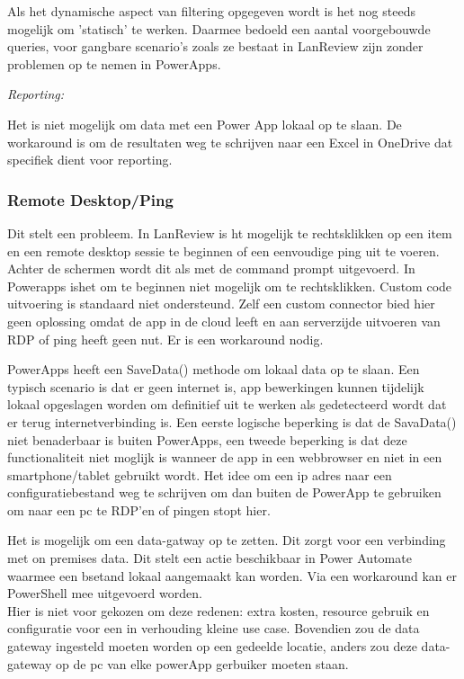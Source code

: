 Als het dynamische aspect van filtering opgegeven wordt is het nog steeds mogelijk om 'statisch' te werken. Daarmee bedoeld een aantal voorgebouwde queries, voor gangbare scenario's zoals ze bestaat in LanReview zijn zonder problemen op te nemen in PowerApps.

\textit{Reporting:}

Het is niet mogelijk om data met een Power App lokaal op te slaan. De workaround is om de resultaten weg te schrijven naar een Excel in OneDrive dat specifiek dient voor reporting.

\subsubsection{Remote Desktop/Ping}
\label{subsec:rdp-ping}

Dit stelt een probleem. In LanReview is ht mogelijk te rechtsklikken op een item en een remote desktop sessie te beginnen of een eenvoudige ping uit te voeren. Achter de schermen wordt dit als met de command prompt uitgevoerd. In Powerapps ishet om te beginnen niet mogelijk om te rechtsklikken. Custom code uitvoering is standaard niet ondersteund. Zelf een custom connector bied hier geen oplossing omdat de app in de cloud leeft en aan serverzijde uitvoeren van RDP of ping heeft geen nut. Er is een workaround nodig.

PowerApps heeft een SaveData() methode om lokaal data op te slaan. Een typisch scenario is dat er geen internet is, app bewerkingen kunnen tijdelijk lokaal opgeslagen worden om definitief uit te werken als gedetecteerd wordt dat er terug internetverbinding is. Een eerste logische beperking is dat de SavaData() niet benaderbaar is buiten PowerApps, een tweede beperking is dat deze functionaliteit niet moglijk is wanneer de app in een webbrowser en niet in een smartphone/tablet gebruikt wordt. Het idee om een ip adres naar een configuratiebestand weg te schrijven om dan buiten de PowerApp te gebruiken om naar een pc te RDP'en of pingen stopt hier.

Het is mogelijk om een data-gatway op te zetten. Dit zorgt voor een verbinding met on premises data. Dit stelt een actie beschikbaar in Power Automate waarmee een bsetand lokaal aangemaakt kan worden. Via een workaround kan er PowerShell mee uitgevoerd worden. \autocite{Luca2017}\\
Hier is niet voor gekozen om deze redenen: extra kosten, resource gebruik en configuratie voor een in verhouding kleine use case. Bovendien zou de data gateway ingesteld moeten worden op een gedeelde locatie, anders zou deze data-gateway op de pc van elke powerApp gerbuiker moeten staan.

